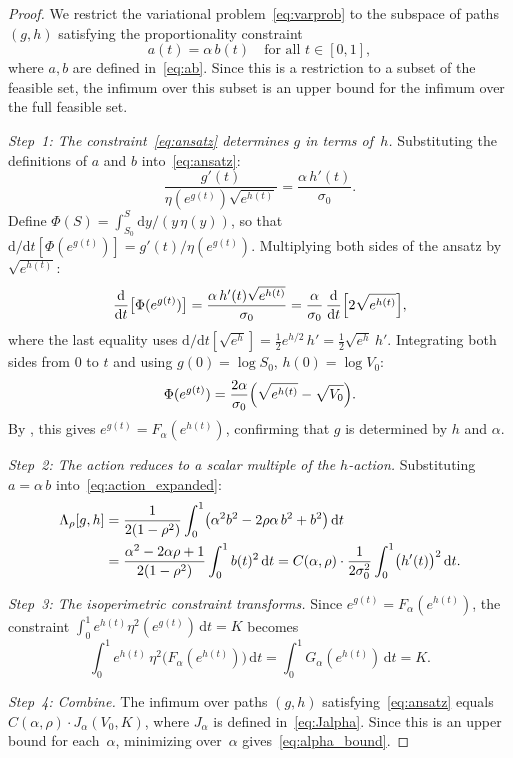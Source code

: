 \documentclass[12pt]{article}
\newcommand{\dd}{\mathrm{d}}
\begin{document}
\begin{proof}
We restrict the variational problem~\eqref{eq:varprob} to the subspace of paths $(g,h)$
satisfying the proportionality constraint
\begin{equation}\label{eq:ansatz}
a(t) = \alpha\,b(t) \quad\text{for all }t\in[0,1],
\end{equation}
where $a,b$ are defined in~\eqref{eq:ab}. Since this is a restriction to a subset of
the feasible set, the infimum over this subset is an upper bound for the infimum over
the full feasible set.

\emph{Step~1: The constraint~\eqref{eq:ansatz} determines $g$ in terms of~$h$.}
Substituting the definitions of $a$ and $b$ into~\eqref{eq:ansatz}:
\[
\frac{g'(t)}{\eta(e^{g(t)})\sqrt{e^{h(t)}}} = \frac{\alpha\,h'(t)}{\sigma_0}.
\]
Define $\Phi(S) = \int_{S_0}^S \dd y/(y\,\eta(y))$, so that
$\dd/\dd t[\Phi(e^{g(t)})] = g'(t)/\eta(e^{g(t)})$. Multiplying both sides of the
ansatz by $\sqrt{e^{h(t)}}$:
\[
\frac{\dd}{\dd t}\bigl[\Phi(e^{g(t)})\bigr]
  = \frac{\alpha\,h'(t)\sqrt{e^{h(t)}}}{\sigma_0}
  = \frac{\alpha}{\sigma_0}\,\frac{\dd}{\dd t}\Bigl[2\sqrt{e^{h(t)}}\Bigr],
\]
where the last equality uses
$\dd/\dd t[\sqrt{e^h}] = \tfrac{1}{2}e^{h/2}\,h' = \tfrac{1}{2}\sqrt{e^h}\,h'$.
Integrating both sides from $0$ to $t$ and using $g(0)=\log S_0$, $h(0)=\log V_0$:
\[
\Phi(e^{g(t)}) = \frac{2\alpha}{\sigma_0}\Bigl(\sqrt{e^{h(t)}} - \sqrt{V_0}\Bigr).
\]
By , this gives $e^{g(t)} = F_\alpha(e^{h(t)})$, confirming that $g$
is determined by $h$ and $\alpha$.

\emph{Step~2: The action reduces to a scalar multiple of the $h$-action.}
Substituting $a=\alpha\,b$ into~\eqref{eq:action_expanded}:
\begin{align}
\Lambda_\rho[g,h] &= \frac{1}{2(1-\rho^2)}\int_0^1
  \bigl(\alpha^2 b^2 - 2\rho\alpha\,b^2 + b^2\bigr)\,\dd t \notag \\
  &= \frac{\alpha^2-2\alpha\rho+1}{2(1-\rho^2)}\int_0^1 b(t)^2\,\dd t
  = C(\alpha,\rho)\cdot\frac{1}{2\sigma_0^2}\int_0^1 \bigl(h'(t)\bigr)^2\,\dd t.
  \label{eq:action_reduced}
\end{align}

\emph{Step~3: The isoperimetric constraint transforms.}
Since $e^{g(t)} = F_\alpha(e^{h(t)})$, the constraint
$\int_0^1 e^{h(t)}\eta^2(e^{g(t)})\,\dd t = K$ becomes
\[
\int_0^1 e^{h(t)}\,\eta^2\bigl(F_\alpha(e^{h(t)})\bigr)\,\dd t
  = \int_0^1 G_\alpha(e^{h(t)})\,\dd t = K.
\]

\emph{Step~4: Combine.}
The infimum over paths $(g,h)$ satisfying~\eqref{eq:ansatz} equals
$C(\alpha,\rho)\cdot J_\alpha(V_0,K)$, where $J_\alpha$ is defined
in~\eqref{eq:Jalpha}. Since this is an upper bound for each~$\alpha$, minimizing
over~$\alpha$ gives~\eqref{eq:alpha_bound}.
\end{proof}
\end{document}
